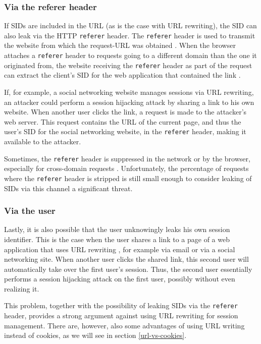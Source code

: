 \subsubsection{Via the referer header}\label{leaking-via-referer}

If SIDs are included in the URL (as is the case with URL rewriting), the SID can also leak via the HTTP \texttt{referer} header. The \texttt{referer} header is used to transmit the website from which the request-URL was obtained \cite{rfc2616}. When the browser attaches a \texttt{referer} header to requests going to a different domain than the one it originated from, the website receiving the \texttt{referer} header as part of the request can extract the client's SID for the web application that contained the link \cite{Fu2001}.

If, for example, a social networking website manages sessions via URL rewriting, an attacker could perform a session hijacking attack by sharing a link to his own website. When another user clicks the link, a request is made to the attacker's web server. This request contains the URL of the current page, and thus the user's SID for the social networking website, in the \texttt{referer} header, making it available to the attacker.

Sometimes, the \texttt{referer} header is suppressed in the network or by the browser, especially for cross-domain requests \cite{Barth2008}. Unfortunately, the percentage of requests where the \texttt{referer} header is stripped is still small enough to consider leaking of SIDs via this channel a significant threat.

\subsubsection{Via the user}\label{leaking-via-user}

Lastly, it is also possible that the user unknowingly leaks his own session identifier. This is the case when the user shares a link to a page of a web application that uses URL rewriting \cite{Johnston2004}, for example via email or via a social networking site. When another user clicks the shared link, this second user will automatically take over the first user's session. Thus, the second user essentially performs a session hijacking attack on the first user, possibly without even realizing it.

This problem, together with the possibility of leaking SIDs via the \texttt{referer} header, provides a strong argument against using URL rewriting for session management. There are, however, also some advantages of using URL writing instead of cookies, as we will see in section \ref{url-vs-cookies}.

